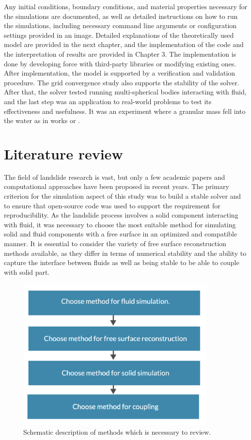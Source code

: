 Any initial conditions, boundary conditions, and material properties necessary for the simulations are documented, as well as detailed instructions on how to run the simulations, including necessary command line arguments or configuration settings provided in an image. Detailed explanations of the theoretically used model are provided in the next chapter, and the implementation of the code and the interpretation of results are provided in Chapter 3. The implementation is done by developing force with third-party libraries or modifying existing ones. After implementation, the model is supported by a verification and validation procedure. The grid convergence study also supports the stability of the solver. After that, the solver tested running multi-spherical bodies interacting with fluid, and the last step was an application to real-world problems to test its effectiveness and usefulness. It was an experiment where a granular mass fell into the water as in works \cite{mao2020resolved} or \cite{shen2022resolved}.

\section{Literature review}

The field of landslide research is vast, but only a few academic papers and computational approaches have been proposed in recent years. The primary criterion for the simulation aspect of this study was to build a stable solver and to ensure that open-source code was used to support the requirement for reproducibility. As the landslide process involves a solid component interacting with fluid, it was necessary to choose the most suitable method for simulating solid and fluid components with a free surface in an optimized and compatible manner. It is essential to consider the variety of free surface reconstruction methods available, as they differ in terms of numerical stability and the ability to capture the interface between fluids as well as being stable to be able to couple with solid part. 

\begin{figure}[!ht]
    \centering
    \includegraphics[width=10cm]{GWU_Thesis_Sarmakeeva/Images/chap1/lit_rew.png}
    \caption{Schematic description of methods which is necessary to review.}
    \label{fig:aims}
\end{figure}

